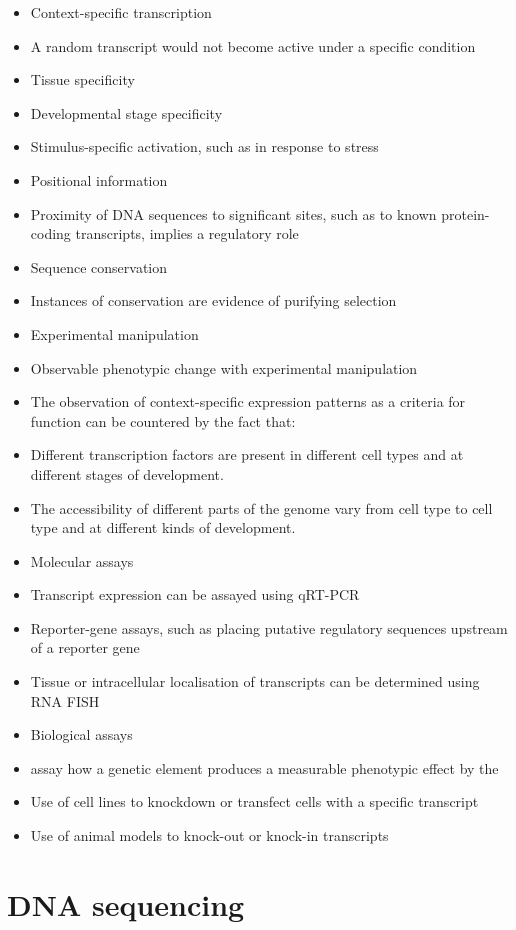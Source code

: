 \begin{itemize}
   \item Context-specific transcription
   \item A random transcript would not become active under a specific condition
   \item Tissue specificity
   \item Developmental stage specificity
   \item Stimulus-specific activation, such as in response to stress
   \item Positional information
   \item Proximity of DNA sequences to significant sites, such as to known protein-coding transcripts, implies a regulatory role
   \item Sequence conservation
   \item Instances of conservation are evidence of purifying selection
   \item Experimental manipulation
   \item Observable phenotypic change with experimental manipulation
   \item The observation of context-specific expression patterns as a criteria for function can be countered by the fact that:
   \item Different transcription factors are present in different cell types and at different stages of development.
   \item The accessibility of different parts of the genome vary from cell type to cell type and at different kinds of development.
   \item Molecular assays
   \item Transcript expression can be assayed using qRT-PCR
   \item Reporter-gene assays, such as placing putative regulatory sequences upstream of a reporter gene
   \item Tissue or intracellular localisation of transcripts can be determined using RNA FISH
   \item Biological assays
   \item assay how a genetic element produces a measurable phenotypic effect by the
   \item Use of cell lines to knockdown or transfect cells with a specific transcript
   \item Use of animal models to knock-out or knock-in transcripts
\end{itemize}

\section{DNA sequencing}

